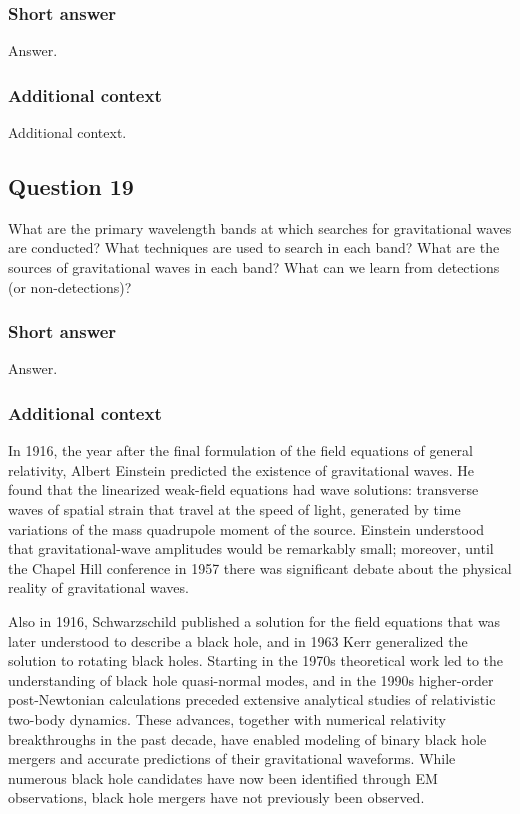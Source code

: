 \documentclass[a4paper,10pt]{article}
\begin{document}
\subsubsection{Short answer}

Answer.

\subsubsection{Additional context}

Additional context.


\newpage
\subsection{Question 19}

What are the primary wavelength bands at which searches for gravitational waves are conducted? What techniques are used to search in each band? What are the sources of gravitational waves in each band? What can we learn from detections (or non-detections)?

\subsubsection{Short answer}

Answer.

\subsubsection{Additional context}

In 1916, the year after the final formulation of the field equations of general relativity, Albert Einstein predicted the existence of gravitational waves. He found that the linearized weak-field equations had wave solutions: transverse waves of spatial strain that travel at the speed of light, generated by time variations of the mass quadrupole moment of the source. Einstein understood that gravitational-wave amplitudes would be remarkably small; moreover, until the Chapel Hill conference in 1957 there was significant debate about the physical reality of gravitational waves.

{\noindent}Also in 1916, Schwarzschild published a solution for the field equations that was later understood to describe a black hole, and in 1963 Kerr generalized the solution to rotating black holes. Starting in the 1970s theoretical work led to the understanding of black hole quasi-normal modes, and in the 1990s higher-order post-Newtonian calculations preceded extensive analytical studies of relativistic two-body dynamics. These advances, together with numerical relativity breakthroughs in the past decade, have enabled modeling of binary black hole mergers and accurate predictions of their gravitational waveforms. While numerous black hole candidates have now been identified through EM observations, black hole mergers have not previously been observed.
\end{document}
